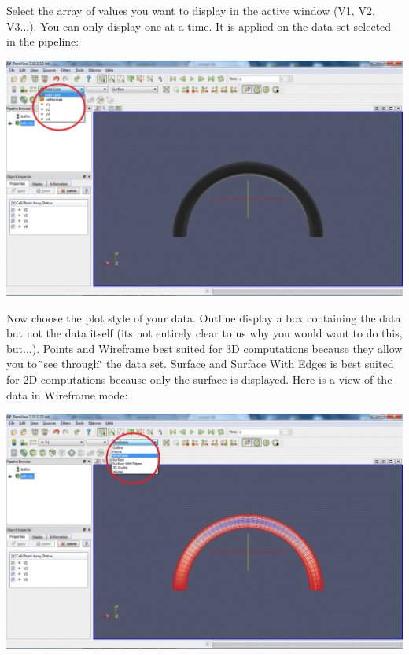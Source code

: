 Select the array of values you want to display in the active window (V1, V2, V3...). You can only display one at a time. It is applied on the data set selected in the pipeline\+:

 
\begin{DoxyImageNoCaption}
  \mbox{\includegraphics[width=\textwidth]{paraview02}}
\end{DoxyImageNoCaption}


Now choose the plot style of your data. {\ttfamily Outline} display a box containing the data but not the data itself (it\textquotesingle{}s not entirely clear to us why you would want to do this, but...). {\ttfamily Points} and {\ttfamily Wireframe} best suited for 3D computations because they allow you to \char`\"{}see 
through\char`\"{} the data set. {\ttfamily Surface} and {\ttfamily Surface} {\ttfamily With} {\ttfamily Edges} is best suited for 2D computations because only the surface is displayed. Here is a view of the data in {\ttfamily Wireframe} mode\+:

 
\begin{DoxyImageNoCaption}
  \mbox{\includegraphics[width=\textwidth]{paraview03}}
\end{DoxyImageNoCaption}



